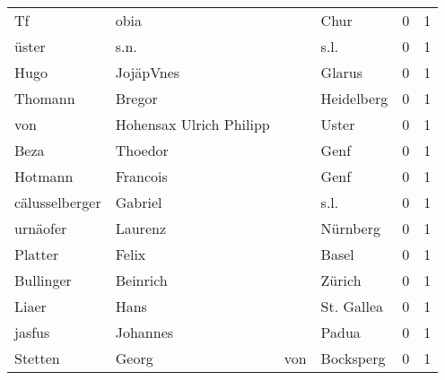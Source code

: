 \documentclass[10pt,a4paper,landscape]{article}
\begin{document}
\begin{longtable}{llllrr}
                       Tf &                               obia &             &                                        Chur &          0 &         1 \\
                    üster &                               s.n. &             &                                        s.l. &          0 &         1 \\
                     Hugo &                          JojäpVnes &             &                                      Glarus &          0 &         1 \\
                  Thomann &                             Bregor &             &                                  Heidelberg &          0 &         1 \\
                      von &            Hohensax Ulrich Philipp &             &                                       Uster &          0 &         1 \\
                     Beza &                            Thoedor &             &                                        Genf &          0 &         1 \\
                  Hotmann &                           Francois &             &                                        Genf &          0 &         1 \\
           cälusselberger &                            Gabriel &             &                                        s.l. &          0 &         1 \\
                 urnäofer &                            Laurenz &             &                                    Nürnberg &          0 &         1 \\
                  Platter &                              Felix &             &                                       Basel &          0 &         1 \\
                Bullinger &                           Beinrich &             &                                      Zürich &          0 &         1 \\
                    Liaer &                               Hans &             &                                  St. Gallea &          0 &         1 \\
                   jasfus &                           Johannes &             &                                       Padua &          0 &         1 \\
                  Stetten &                              Georg &         von &                                   Bocksperg &          0 &         1 \\

\end{longtable}
\end{document}
